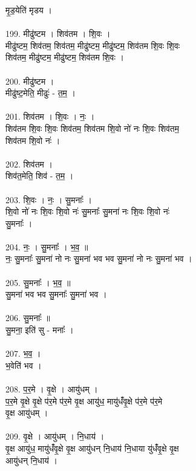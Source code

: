 मृ॒ड॒येति॑ मृडय ।\\
\\
199. मीढु॑ष्टम । शिव॑तम । शि॒वः ।\\
मीढु॑ष्टम॒ शिव॑तम॒ शिव॑तम॒ मीढु॑ष्टम॒ मीढु॑ष्टम॒ शिव॑तम शि॒वः शि॒वः\\
शिव॑तम॒ मीढु॑ष्टम॒ मीढु॑ष्टम॒ शिव॑तम शि॒वः ।\\
\\
200. मीढु॑ष्टम ।\\
मीढु॑ष्ट॒मेति॒ मीढुः॑ - त॒म॒ ।\\
\\
201. शिव॑तम । शि॒वः । नः॒ ।\\
शिव॑तम शि॒वः शि॒वः शिव॑तम॒ शिव॑तम शि॒वो नो॑ नः शि॒वः शिव॑तम॒\\
शिव॑तम शि॒वो नः॑ ।\\
\\
202. शिव॑तम ।\\
शिव॑त॒मेति॒ शिव॑ - त॒म॒ ।\\
\\
203. शि॒वः । नः॒ । सु॒मनाः᳚ ।\\
शि॒वो नो॑ नः शि॒वः शि॒वो नः॑ सु॒मनाः᳚ सु॒मना॑ नः शि॒वः शि॒वो नः॑\\
सु॒मनाः᳚ ।\\
\\
204. नः॒ । सु॒मनाः᳚ । भ॒व॒ ॥\\
नः॒ सु॒मनाः᳚ सु॒मना॑ नो नः सु॒मना॑ भव भव सु॒मना॑ नो नः सु॒मना॑ भव ।\\
\\
205. सु॒मनाः᳚ । भ॒व॒ ॥\\
सु॒मना॑ भव भव सु॒मनाः᳚ सु॒मना॑ भव ।\\
\\
206. सु॒मनाः᳚ ॥\\
सु॒मना॒ इति॑ सु - मनाः᳚ ।\\
\\
207. भ॒व॒ ।\\
भ॒वेति॑ भव ।\\
\\
208. प॒र॒मे । वृ॒क्षे । आयु॑धम् ।\\
प॒र॒मे वृ॒क्षे वृ॒क्षे प॑र॒मे प॑र॒मे वृ॒क्ष आयु॑ध॒ मायु॑धंँवृ॒क्षे प॑र॒मे प॑र॒मे\\
वृ॒क्ष आयु॑धम् ।\\
\\
209. वृ॒क्षे । आयु॑धम् । नि॒धाय॑ ।\\
वृ॒क्ष आयु॑ध॒ मायु॑धंँवृ॒क्षे वृ॒क्ष आयु॑धन् नि॒धाय॑ नि॒धाया यु॑धंँवृ॒क्षे वृ॒क्ष\\
आयु॑धन् नि॒धाय॑ ।\\
